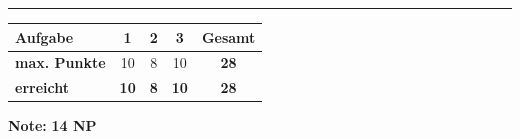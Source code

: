 \documentclass[11pt, a4paper]{article}
\newcommand{\lsg}[1]{\textcolor{loesung}{\textbf{#1}}}
\begin{document}

\vspace{25pt}
\hrule
\vspace{10pt}

\noindent
\begin{tabularx}{\textwidth}{|X|c|c|c||c|}
\hline
\textbf{Aufgabe} & 1 & 2 & 3 & \textbf{Gesamt} \\
\hline
\textbf{max. Punkte} & 10 & 8 & 10 & \textbf{28} \\
\hline
\textbf{erreicht} & \lsg{10} & \lsg{8} & \lsg{10} & \lsg{28} \\[0.8em]
\hline
\end{tabularx}

\vspace{10pt}

\begin{flushright}
\textbf{Note:} \lsg{14 NP}
\end{flushright}
\end{document}
